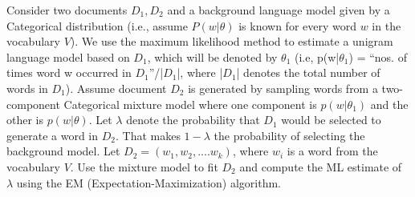 \documentclass[solution,addpoints,12pt]{exam}
\begin{document}
\begin{questions}


\newline
Consider two documents $D_1, D_2$ and a background language model given by a Categorical distribution (i.e., assume $P(w|\theta)$ is known for every word $w$ in the vocabulary $V$). We use the maximum likelihood method to estimate a unigram language model based on $D_1$, which will be denoted by $\theta_1$ (i.e, p(w|$\theta_1$) = ``nos. of times word w occurred in $D_1$''/|$D_1$|, where |$D_1$| denotes the total number of words in $D_1$). Assume document $D_2$ is generated by sampling words from a two-component Categorical mixture model where one component is $p(w|\theta_1)$ and the other is $p(w|\theta)$. Let $\lambda$ denote the probability that $D_1$ would be selected to generate a word in $D_2$. That makes $1-\lambda$ the probability of selecting the background model. Let $D_2 = (w_1,w_2, ....w_k)$, where $w_i$ is a word from the vocabulary $V$. Use the mixture model to fit $D_2$ and compute the ML estimate of $\lambda$ using the EM (Expectation-Maximization) algorithm.
\begin{parts}

\end{parts}
\end{questions}
\end{document}
